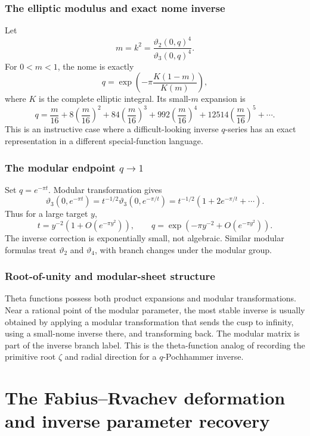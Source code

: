 \documentclass[11pt,letterpaper,oneside,openany]{book}
\theoremstyle{definition}
\theoremstyle{remark}
\begin{document}
\section{The elliptic modulus and exact nome inverse}
Let
\[
 m=k^2=\frac{\vartheta_2(0,q)^4}{\vartheta_3(0,q)^4}.
\]
For \(0<m<1\), the nome is exactly
\begin{equation}\label{eq:nome-exact-inverse}
 q=\exp\left(-\pi\frac{K(1-m)}{K(m)}\right),
\end{equation}
where \(K\) is the complete elliptic integral.  Its small-\(m\) expansion is
\begin{equation}\label{eq:nome-series}
 q=\frac{m}{16}+8\left(\frac{m}{16}\right)^2
 +84\left(\frac{m}{16}\right)^3
 +992\left(\frac{m}{16}\right)^4
 +12514\left(\frac{m}{16}\right)^5+\cdots.
\end{equation}
This is an instructive case where a difficult-looking inverse \(q\)-series has
an exact representation in a different special-function language.

\section{The modular endpoint \texorpdfstring{\(q\to1\)}{q to 1}}
Set \(q=e^{-\pi t}\).  Modular transformation gives
\[
 \vartheta_3(0,e^{-\pi t})
 =t^{-1/2}\vartheta_3(0,e^{-\pi/t})
 =t^{-1/2}\left(1+2e^{-\pi/t}+\cdots\right).
\]
Thus for a large target \(y\),
\[
 t=y^{-2}\left(1+O(e^{-\pi y^2})\right),
 \qquad
 q=\exp(-\pi y^{-2}+O(e^{-\pi y^2})).
\]
The inverse correction is exponentially small, not algebraic.  Similar
modular formulas treat \(\vartheta_2\) and \(\vartheta_4\), with branch changes
under the modular group.

\section{Root-of-unity and modular-sheet structure}
Theta functions possess both product expansions and modular transformations.
Near a rational point of the modular parameter, the most stable inverse is
usually obtained by applying a modular transformation that sends the cusp to
infinity, using a small-nome inverse there, and transforming back.  The modular
matrix is part of the inverse branch label.  This is the theta-function analog
of recording the primitive root \(\zeta\) and radial direction for a
\(q\)-Pochhammer inverse.

\part{The Fabius--Rvachev deformation and inverse parameter recovery}
\end{document}
